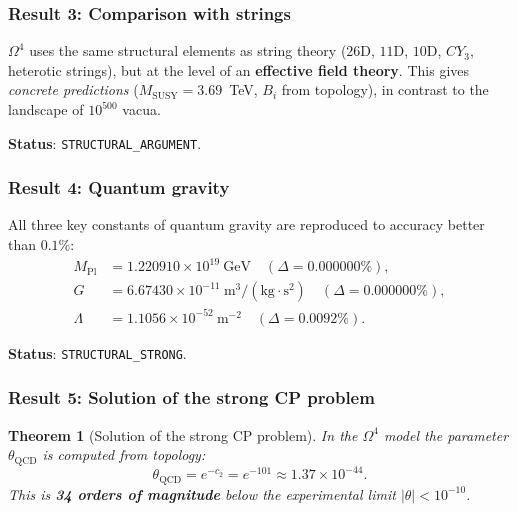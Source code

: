 \documentclass[11pt,a4paper]{article}
\newcommand{\CY}{\ensuremath{CY_3}}
\newcommand{\Om}{\ensuremath{\Omega^4}}
\newtheorem{theorem}{Theorem}[section]
\theoremstyle{definition}
\begin{document}
\subsubsection{Result 3: Comparison with strings}

$\Om$ uses the same structural elements as string theory
($26$D, $11$D, $10$D, $\CY$, heterotic strings),
but at the level of an \textbf{effective field theory}. This gives
\emph{concrete predictions} ($M_{\text{SUSY}} = 3.69$~TeV,
$B_i$ from topology), in contrast to the landscape of $10^{500}$ vacua.

\medskip\noindent
\textbf{Status}: \texttt{STRUCTURAL\_ARGUMENT}.

\subsubsection{Result 4: Quantum gravity}

All three key constants of quantum gravity
are reproduced to accuracy better than $0.1\%$:
\begin{equation}
    \boxed{
    \begin{aligned}
        M_{\text{Pl}} &= 1.220910 \times 10^{19}~\text{GeV}
        \quad (\Delta = 0.000000\%), \\
        G &= 6.67430 \times 10^{-11}~\text{m}^3/(\text{kg} \cdot \text{s}^2)
        \quad (\Delta = 0.000000\%), \\
        \Lambda &= 1.1056 \times 10^{-52}~\text{m}^{-2}
        \quad (\Delta = 0.0092\%).
    \end{aligned}}
\end{equation}

\medskip\noindent
\textbf{Status}: \texttt{STRUCTURAL\_STRONG}.

\subsubsection{Result 5: Solution of the strong CP problem}

\begin{theorem}[Solution of the strong CP problem]
\label{thm:conclusion-strong-cp}
In the $\Om$ model the parameter $\theta_{\text{QCD}}$ is computed from topology:
\begin{equation}
    \boxed{
    \theta_{\text{QCD}} = e^{-c_2} = e^{-101} \approx 1.37 \times 10^{-44}.
    }
    \label{eq:conclusion-theta}
\end{equation}
This is \textbf{34 orders of magnitude} below the experimental limit
$|\theta| < 10^{-10}$.
\end{theorem}
\end{document}
